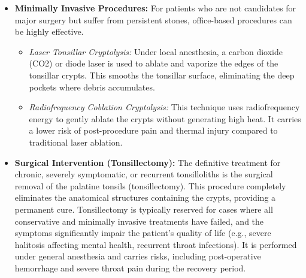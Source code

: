\begin{itemize}
\begin{itemize}
    \end{itemize}
    \item \textbf{Minimally Invasive Procedures:} For patients who are not candidates for major surgery but suffer from persistent stones, office-based procedures can be highly effective.
    \begin{itemize}
        \item \textit{Laser Tonsillar Cryptolysis:} Under local anesthesia, a carbon dioxide (CO2) or diode laser is used to ablate and vaporize the edges of the tonsillar crypts. This smooths the tonsillar surface, eliminating the deep pockets where debris accumulates.
        \item \textit{Radiofrequency Coblation Cryptolysis:} This technique uses radiofrequency energy to gently ablate the crypts without generating high heat. It carries a lower risk of post-procedure pain and thermal injury compared to traditional laser ablation.
    \end{itemize}
    \item \textbf{Surgical Intervention (Tonsillectomy):} The definitive treatment for chronic, severely symptomatic, or recurrent tonsilloliths is the surgical removal of the palatine tonsils (tonsillectomy). This procedure completely eliminates the anatomical structures containing the crypts, providing a permanent cure. Tonsillectomy is typically reserved for cases where all conservative and minimally invasive treatments have failed, and the symptoms significantly impair the patient's quality of life (e.g., severe halitosis affecting mental health, recurrent throat infections). It is performed under general anesthesia and carries risks, including post-operative hemorrhage and severe throat pain during the recovery period.
\end{itemize}

